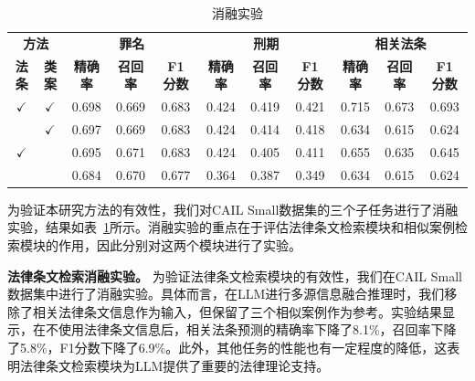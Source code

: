 \begin{table}[!bp]
	\centering
	\begin{tabular}{cc|ccc|ccc|ccc}
		\hline
		\multicolumn{2}{c|}{\textbf{方法}} & \multicolumn{3}{|c|}{\textbf{罪名}} & \multicolumn{3}{|c|}{\textbf{刑期}} & \multicolumn{3}{|c}{\textbf{相关法条}}                                                                                                                \\
		\cline{1-2}\cline{3-5}\cline{6-8}\cline{9-11}
		\textbf{法条}                      & \textbf{类案}                       & \textbf{精确率}                      & \textbf{召回率}                       & \textbf{F1 分数} & \textbf{精确率} & \textbf{召回率} & \textbf{F1 分数} & \textbf{精确率} & \textbf{召回率} & \textbf{F1 分数} \\
		\hline
		$\checkmark$                     & $\checkmark$                      & 0.698                             & 0.669                              & 0.683          & 0.424        & 0.419        & 0.421          & 0.715        & 0.673        & 0.693          \\
		                                 & $\checkmark$                      & 0.697                             & 0.669                              & 0.683          & 0.424        & 0.414        & 0.418          & 0.634        & 0.615        & 0.624          \\
		$\checkmark$                     &                                   & 0.695                             & 0.671                              & 0.683          & 0.424        & 0.405        & 0.411          & 0.655        & 0.635        & 0.645          \\
		                                 &                                   & 0.684                             & 0.670                              & 0.677          & 0.364        & 0.387        & 0.349          & 0.634        & 0.615        & 0.624          \\
		\hline
	\end{tabular}
	\caption{消融实验}
	\label{tab:ablation}
\end{table}
为验证本研究方法的有效性，我们对CAIL Small数据集的三个子任务进行了消融实验，结果如表~\ref{tab:ablation}所示。消融实验的重点在于评估法律条文检索模块和相似案例检索模块的作用，因此分别对这两个模块进行了实验。



\textbf{法律条文检索消融实验。}
为验证法律条文检索模块的有效性，我们在CAIL Small数据集中进行了消融实验。具体而言，在LLM进行多源信息融合推理时，我们移除了相关法律条文信息作为输入，但保留了三个相似案例作为参考。实验结果显示，在不使用法律条文信息后，相关法条预测的精确率下降了8.1\%，召回率下降了5.8\%，F1分数下降了6.9\%。此外，其他任务的性能也有一定程度的降低，这表明法律条文检索模块为LLM提供了重要的法律理论支持。


